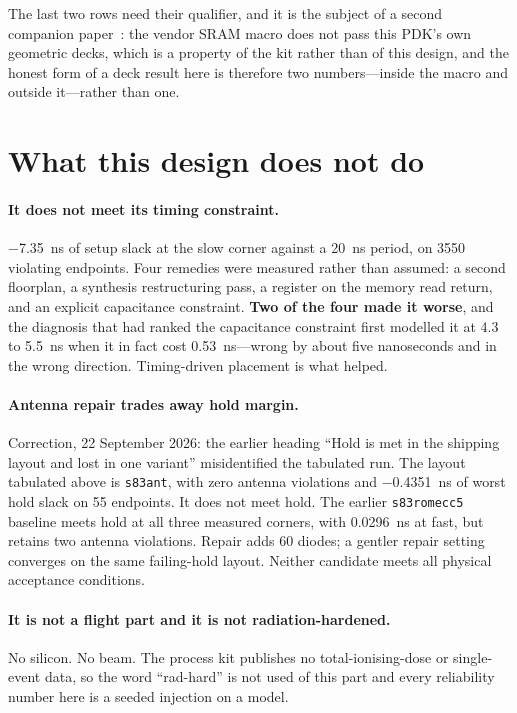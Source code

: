\documentclass[11pt,a4paper]{article}
\begin{document}
The last two rows need their qualifier, and it is the subject of a
second companion paper~\cite{companion_decks}: the vendor SRAM macro does not pass this PDK's own
geometric decks, which is a property of the kit rather than of this
design, and the honest form of a deck result here is therefore two
numbers---inside the macro and outside it---rather than one.

\section{What this design does not do}
\label{sec:limits}

\paragraph{It does not meet its timing constraint.}
\SI{-7.35}{\nano\second} of setup slack at the slow corner against a
\SI{20}{\nano\second} period, on \num{3550} violating endpoints. Four
remedies were measured rather than assumed: a second floorplan, a
synthesis restructuring pass, a register on the memory read return, and
an explicit capacitance constraint. \textbf{Two of the four made it
worse}, and the diagnosis that had ranked the capacitance constraint
first modelled it at \SI{+4.3}{} to \SI{+5.5}{\nano\second} when it in
fact cost \SI{0.53}{\nano\second}---wrong by about five nanoseconds and
in the wrong direction. Timing-driven placement is what helped.

\paragraph{Antenna repair trades away hold margin.}
Correction, 22 September 2026: the earlier heading ``Hold is met in the
shipping layout and lost in one variant'' misidentified the tabulated run.
The layout tabulated above is \texttt{s83ant}, with zero antenna
violations and \SI{-0.4351}{\nano\second} of worst hold slack on
\num{55} endpoints. It does not meet hold. The earlier
\texttt{s83romecc5} baseline meets hold at all three measured corners,
with \SI{+0.0296}{\nano\second} at fast, but retains two antenna
violations. Repair adds \num{60} diodes; a gentler repair setting
converges on the same failing-hold layout. Neither candidate meets all
physical acceptance conditions.

\paragraph{It is not a flight part and it is not radiation-hardened.}
No silicon. No beam. The process kit publishes no total-ionising-dose or
single-event data, so the word ``rad-hard'' is not used of this part and
every reliability number here is a seeded injection on a model.
\end{document}
